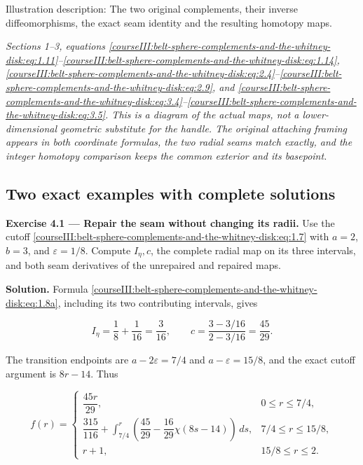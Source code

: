 \label{courseIII:belt-sphere-complements-and-the-whitney-disk:belt-complement-diagram}
Illustration description: The two original complements, their inverse diffeomorphisms, the exact seam identity and the resulting homotopy maps.

\emph{Sections 1--3, equations \eqref{courseIII:belt-sphere-complements-and-the-whitney-disk:eq:1.11}--\eqref{courseIII:belt-sphere-complements-and-the-whitney-disk:eq:1.14}, \eqref{courseIII:belt-sphere-complements-and-the-whitney-disk:eq:2.4}--\eqref{courseIII:belt-sphere-complements-and-the-whitney-disk:eq:2.9}, and \eqref{courseIII:belt-sphere-complements-and-the-whitney-disk:eq:3.4}--\eqref{courseIII:belt-sphere-complements-and-the-whitney-disk:eq:3.5}. This is a diagram of the actual maps, not a lower-dimensional geometric substitute for the handle. The original attaching framing appears in both coordinate formulas, the two radial seams match exactly, and the integer homotopy comparison keeps the common exterior and its basepoint.}

\subsection{Two exact examples with complete solutions}
\label{courseIII:belt-sphere-complements-and-the-whitney-disk:belt-exercises}

\label{courseIII:belt-sphere-complements-and-the-whitney-disk:section-4}\label{courseIII:belt-complement:4}

\textbf{Exercise 4.1 --- Repair the seam without changing its radii.} Use the cutoff \eqref{courseIII:belt-sphere-complements-and-the-whitney-disk:eq:1.7} with \(a=2\), \(b=3\), and \(\varepsilon=1/8\). Compute \(I_\eta,c\), the complete radial map on its three intervals, and both seam derivatives of the unrepaired and repaired maps.

\textbf{Solution.} Formula \eqref{courseIII:belt-sphere-complements-and-the-whitney-disk:eq:1.8a}, including its two contributing intervals, gives

\begin{equation}
I_\eta=\frac18+\frac1{16}=\frac3{16},\qquad
c=\frac{3-3/16}{2-3/16}=\frac{45}{29}.
\label{courseIII:belt-sphere-complements-and-the-whitney-disk:eq:4.1}
\end{equation}

The transition endpoints are \(a-2\varepsilon=7/4\) and \(a-\varepsilon=15/8\), and the exact cutoff argument is \(8r-14\). Thus

\begin{equation}
f(r)=
\begin{cases}
\dfrac{45r}{29},&0\leq r\leq7/4,\\[2mm]
\dfrac{315}{116}+
\displaystyle\int_{7/4}^{r}
\left(\dfrac{45}{29}-\dfrac{16}{29}\chi(8s-14)\right)\,ds,
&7/4\leq r\leq15/8,\\[2mm]
r+1,&15/8\leq r\leq2.
\end{cases}
\label{courseIII:belt-sphere-complements-and-the-whitney-disk:eq:4.2}
\end{equation}

